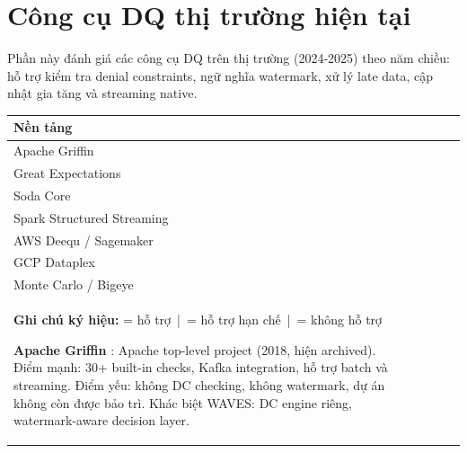 \section{Công cụ DQ thị trường hiện tại}

Phần này đánh giá các công cụ DQ trên thị trường (2024-2025) theo năm chiều: hỗ trợ kiểm tra denial constraints, ngữ nghĩa watermark, xử lý late data, cập nhật gia tăng và streaming native.

{\small
\begin{longtable}{|L{0.20\textwidth}|c|c|c|c|c|}
\hline
\textbf{Nền tảng} &  &  &  &  &  \\
\hline
Apache Griffin &  &  &  &  &  \\
\hline
Great Expectations &  &  &  &  &  \\
\hline
Soda Core &  &  &  &  &  \\
\hline
Spark Structured Streaming &  &  &  &  &  \\
\hline
AWS Deequ / Sagemaker &  &  &  &  &  \\
\hline
GCP Dataplex &  &  &  &  &  \\
\hline
Monte Carlo / Bigeye &  &  &  &  &  \\
\hline
\textbf{Ghi chú ký hiệu:}  = hỗ trợ \,|\,  = hỗ trợ hạn chế \,|\,  = không hỗ trợ

\medskip\noindent\textbf{Apache Griffin} \cite{griffin}: Apache top-level project (2018, hiện archived). Điểm mạnh: 30+ built-in checks, Kafka integration, hỗ trợ batch và streaming. Điểm yếu: không DC checking, không watermark, dự án không còn được bảo trì. Khác biệt WAVES: DC engine riêng, watermark-aware decision layer.


\end{longtable}}
